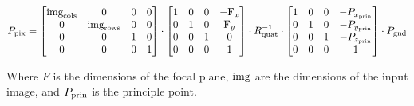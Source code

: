 \begin{equation}
P_{\textup{pix}} = 
\begin{bmatrix} 
\textup{img}_\textup{cols} & 0 & 0 & 0 \\
0 & \textup{img}_\textup{rows} & 0 & 0 \\
0 & 0 & 1 & 0 \\
0 & 0 & 0 & 1 
\end{bmatrix}
\cdot
\begin{bmatrix}
1 & 0 & 0 & -\textup{F}_x\\ 
0 & 1 & 0 & \textup{F}_y\\ 
0 & 0 & 1 & 0\\ 
0 & 0 & 0 & 1
\end{bmatrix}
\cdot
R^{-1}_{\textup{quat}} \cdot \begin{bmatrix}
1 & 0 & 0 & -P_{x_\textup{prin}} \\ 
0 & 1 & 0 & -P_{y_\textup{prin}}\\ 
0 & 0 & 1 & -P_{z_\textup{prin}}\\ 
0 & 0 & 0 & 1
\end{bmatrix} \cdot P_{\textup{gnd}} 
\end{equation}

Where $F$ is the dimensions of the focal plane, $\textup{img}$ are the dimensions of the input image, and $P_\textup{prin}$ is the principle point.


